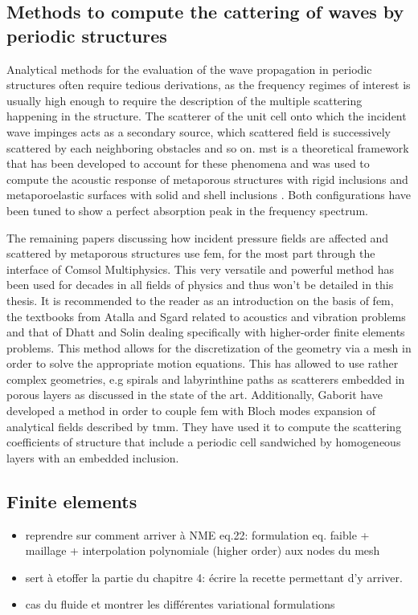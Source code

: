 \subsection{Methods to compute the cattering of waves by periodic structures} 
Analytical methods for the evaluation of the wave propagation in periodic structures often require tedious derivations, as the frequency regimes of interest is usually high enough to require the description of the multiple scattering happening in the structure. The scatterer of the unit cell onto which the incident wave impinges acts as a secondary source, which scattered field is successively scattered by each neighboring obstacles and so on. \acrlong{mst} is a theoretical framework that has been developed to account for these phenomena and was used to compute the acoustic response of metaporous structures with rigid inclusions \cite{groby2011} and metaporoelastic surfaces with solid and shell inclusions \cite{weisser2016}. Both configurations have been tuned to show a perfect absorption peak in the frequency spectrum. 

The remaining papers discussing how incident pressure fields are affected and scattered by metaporous structures use \acrshort{fem}, for the most part through the interface of Comsol Multiphysics. This very versatile and powerful method has been used for decades in all fields of physics and thus won't be detailed in this thesis. It is recommended to the reader as an introduction on the basis of \acrshort{fem}, the textbooks from {Atalla} and {Sgard}\cite{atalla2015} related to acoustics and vibration problems and that of Dhatt \etal \cite{dhatt2005} and Solin \etal \cite{solinHigherorderFiniteElement2004} dealing specifically with higher-order finite elements problems. This method allows for the discretization of the geometry via a mesh in order to solve the appropriate motion equations. This has allowed to use rather complex geometries, e.g spirals \cite{zhong2019} and labyrinthine paths \cite{liuAcousticLabyrinthinePorous2021} as scatterers embedded in porous layers as discussed in the state of the art. Additionally, Gaborit \etal \cite{gaborit2018} have developed a method in order to couple \acrshort{fem} with Bloch modes expansion of analytical fields described by \acrshort{tmm}. They have used it to compute the scattering coefficients of structure that include a periodic cell sandwiched by homogeneous layers with an embedded inclusion.

\subsection{Finite elements}
\begin{itemize}
    \item reprendre sur comment arriver à NME eq.22: formulation eq. faible + maillage + interpolation polynomiale (higher order) aux nodes du mesh
    \item sert à etoffer la partie du chapitre 4: écrire la recette permettant d'y arriver.
    \item cas du fluide et montrer les différentes variational formulations
\end{itemize}

